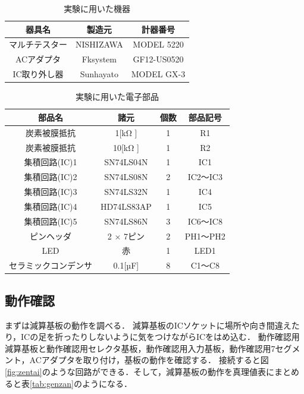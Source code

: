 \documentclass[a4paper,11pt,dvipdfmx]{jsarticle}
\begin{document}
\begin{table}[H]
  \caption{実験に用いた機器}
  \centering
  \begin{tabular}{c|c|c}
    \hline
    器具名         & 製造元    & 計器番号    \\
    \hline \hline
    マルチテスター & NISHIZAWA & MODEL 5220  \\
    \hline
    ACアダプタ     & Fksystem  & GF12-US0520 \\
    \hline
    IC取り外し器   & Sunhayato & MODEL GX-3  \\
    \hline
  \end{tabular}
  \label{tab:equipment}
\end{table}

\begin{table}[H]
  \caption{実験に用いた電子部品}
  \centering
  \begin{tabular}{c|c|c|c}
    \hline
    部品名               & 諸元          & 個数 & 部品記号 \\
    \hline \hline
    炭素被膜抵抗         & 1[kΩ ]   & 1    & R1       \\
    \hline
    炭素被膜抵抗         & 10[kΩ ]  & 1    & R2       \\
    \hline
    集積回路(IC)1        & SN74LS04N     & 1    & IC1      \\
    \hline
    集積回路(IC)2        & SN74LS08N     & 2    & IC2～IC3 \\
    \hline
    集積回路(IC)3        & SN74LS32N     & 1    & IC4      \\
    \hline
    集積回路(IC)4        & HD74LS83AP     & 1    & IC5      \\
    \hline
    集積回路(IC)5        & SN74LS86N     & 3    & IC6～IC8 \\
    \hline
    ピンヘッダ           & 2 × 7ピン & 2    & PH1～PH2 \\
    \hline
    LED                  & 赤            & 1    & LED1     \\
    \hline
    セラミックコンデンサ & 0.1[µF]       & 8    & C1～C8   \\
    \hline
  \end{tabular}
  \label{tab:electronicParts}
\end{table}

\subsection{動作確認}
まずは減算基板の動作を調べる．
減算基板のICソケットに場所や向き間違えたり，ICの足を折ったりしないように気をつけながらICをはめ込む．
動作確認用減算基板と動作確認用セレクタ基板，動作確認用入力基板，動作確認用7セグメント，ACアダプタを取り付け，基板の動作を確認する．
接続すると図\ref{fig:zentai}のような回路ができる．そして，減算基板の動作を真理値表にまとめると表\ref{tab:genzan}のようになる．
\end{document}
